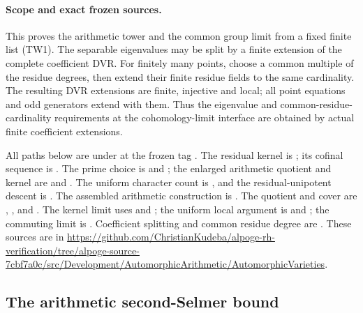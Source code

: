 \paragraph{Scope and exact frozen sources.}
This proves the arithmetic tower and the common group limit
from a fixed finite list (TW1).
The separable eigenvalues may be split by a finite extension of
the complete coefficient DVR.
For finitely many points, choose a common multiple of the residue
degrees, then extend their finite residue fields to the same
cardinality.  The resulting DVR extensions are finite, injective
and local; all point equations and odd generators extend with
them.
Thus the eigenvalue and common-residue-cardinality requirements
at the cohomology-limit interface are obtained by actual finite
coefficient extensions.

All paths below are under
at the frozen tag .
The residual kernel is
;
its cofinal sequence is .
The prime choice is  and
; the enlarged arithmetic quotient and
kernel are  and .
The uniform character count is ,
and the residual-unipotent descent is .
The assembled arithmetic construction is
.
The quotient and cover are
,
, and .
The kernel limit uses  and
; the uniform local argument is
 and
; the commuting limit is
.
Coefficient splitting and common residue degree are
.
These sources are in
\url{https://github.com/ChristianKudeba/alpoge-rh-verification/tree/alpoge-source-7cbf7a0c/src/Development/AutomorphicArithmetic/AutomorphicVarieties}.



\subsection{The arithmetic second-Selmer bound}
\label{sec:arithmetic-second-selmer}

